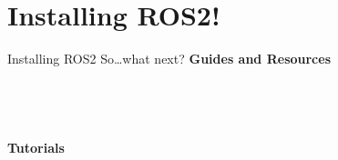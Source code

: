 \documentclass{beamer}
\begin{document}
\section{Installing ROS2!}
\begin{frame}{Installing ROS2}
    {\small So\dots what next?}
    {\Large \textbf{Guides and Resources}}\\
    \href{https://docs.ros.org/en/humble/Installation.html}{} \\
    \href{https://docs.ros.org/en/humble/index.html}{} \\
    \href{https://ros.org/reps/rep-0000.html}{} \\
    \href{https://discourse.ros.org/}{} \\
    \vspace{1cm}
    {\Large \textbf{Tutorials}}

    \href{https://docs.ros.org/en/humble/Tutorials/Beginner-CLI-Tools.html\#}{} \\
    \href{https://docs.ros.org/en/humble/Tutorials/Beginner-Client-Libraries.html}{} \\
\end{frame}
\end{document}
